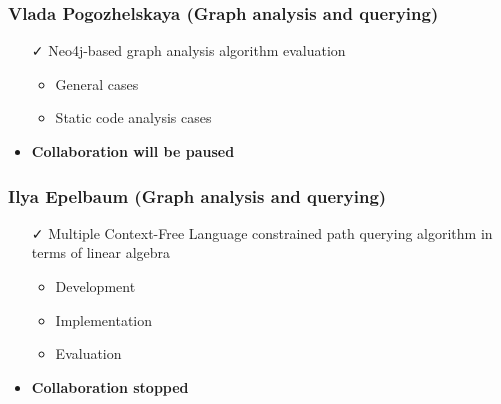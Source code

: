 \documentclass[xcolor=table,aspectratio=169]{beamer}
\begin{document}
\begin{frame}[fragile]
  \frametitle{Vlada Pogozhelskaya (Graph analysis and querying)}
  \begin{minipage}[t]{0.48\textwidth}
    \begin{itemize}
      \item[\faCheck] Neo4j-based graph analysis algorithm evaluation
      \begin{itemize}
        \item General cases
        \item Static code analysis cases
      \end{itemize}  
    \end{itemize}
  \end{minipage}
  \pause
  \begin{minipage}[t]{0.48\textwidth}
    \begin{itemize}
      \item \textbf{Collaboration will be paused}
    \end{itemize}
  \end{minipage}
\end{frame}

\begin{frame}[fragile]
  \frametitle{Ilya Epelbaum (Graph analysis and querying)}
  \begin{minipage}[t]{0.48\textwidth}
    \begin{itemize}
      \item[\faCheck] Multiple Context-Free Language constrained path querying algorithm in terms of linear algebra
      \begin{itemize}
        \item Development
        \item Implementation
        \item Evaluation
      \end{itemize}
    \end{itemize}
  \end{minipage}
  \pause
  \begin{minipage}[t]{0.48\textwidth}
    \begin{itemize}
      \item \textbf{Collaboration stopped}
    \end{itemize}
    
  \end{minipage}
\end{frame}
\end{document}
